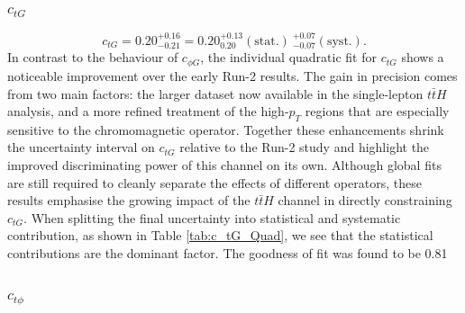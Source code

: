 \subsubsection{$c_{tG}$}

\begin{equation}
    c_{tG} = 0.20^{+0.16}_{-0.21}=0.20^{+0.13}_{0.20} (\text{stat.})~^{+0.07}_{-0.07} (\text{syst.}). 
\end{equation}
In contrast to the behaviour of $c_{\phi G}$, the individual quadratic fit for $c_{tG}$ shows a noticeable improvement over the early Run-2 results. The gain in precision comes from two main factors: the larger dataset now available in the single-lepton $t\bar{t}H$ analysis, and a more refined treatment of the high-$p_{T}$ regions that are especially sensitive to the chromomagnetic operator. Together these enhancements shrink the uncertainty interval on $c_{tG}$ relative to the Run-2 study and highlight the improved discriminating power of this channel on its own. Although global fits are still required to cleanly separate the effects of different operators, these results emphasise the growing impact of the $t\bar{t}H$ channel in directly constraining $c_{tG}$. When splitting the final uncertainty into statistical and systematic contribution, as shown in Table \ref{tab:c_tG_Quad}, we see that the statistical contributions are the dominant factor. The goodness of fit was found to be 0.81
\subsubsection{$c_{t\phi}$}

